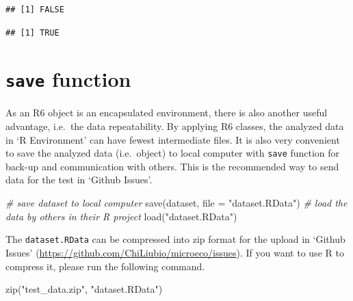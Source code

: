 \documentclass[
]{book}
\newenvironment{Shaded}{\begin{snugshade}}{\end{snugshade}}
\newcommand{\AttributeTok}[1]{\textcolor[rgb]{0.77,0.63,0.00}{#1}}
\newcommand{\CommentTok}[1]{\textcolor[rgb]{0.56,0.35,0.01}{\textit{#1}}}
\newcommand{\ConstantTok}[1]{\textcolor[rgb]{0.00,0.00,0.00}{#1}}
\newcommand{\FunctionTok}[1]{\textcolor[rgb]{0.00,0.00,0.00}{#1}}
\newcommand{\NormalTok}[1]{#1}
\newcommand{\OtherTok}[1]{\textcolor[rgb]{0.56,0.35,0.01}{#1}}
\newcommand{\SpecialCharTok}[1]{\textcolor[rgb]{0.00,0.00,0.00}{#1}}
\newcommand{\StringTok}[1]{\textcolor[rgb]{0.31,0.60,0.02}{#1}}
\begin{document}
\begin{verbatim}
## [1] FALSE
\end{verbatim}

\begin{Shaded}
\end{Shaded}

\begin{verbatim}
## [1] TRUE
\end{verbatim}

\hypertarget{save-function}{%
\section{\texorpdfstring{\texttt{save} function}{save function}}\label{save-function}}

As an R6 object is an encapsulated environment, there is also another useful advantage, i.e.~the data repeatability.
By applying R6 classes, the analyzed data in `R Environment' can have fewest intermediate files.
It is also very convenient to save the analyzed data (i.e.~object) to local computer with \texttt{save} function for back-up and communication with others.
This is the recommended way to send data for the test in `Github Issues'.

\begin{Shaded}
\begin{Highlighting}[]
\CommentTok{\# save \textquotesingle{}dataset\textquotesingle{} to local computer}
\FunctionTok{save}\NormalTok{(dataset, }\AttributeTok{file =} \StringTok{"dataset.RData"}\NormalTok{)}
\CommentTok{\# load the data by others in their R project}
\FunctionTok{load}\NormalTok{(}\StringTok{"dataset.RData"}\NormalTok{)}
\end{Highlighting}
\end{Shaded}

The \texttt{dataset.RData} can be compressed into zip format for the upload in `Github Issues' (\url{https://github.com/ChiLiubio/microeco/issues}).
If you want to use R to compress it, please run the following command.

\begin{Shaded}
\begin{Highlighting}[]
\FunctionTok{zip}\NormalTok{(}\StringTok{"test\_data.zip"}\NormalTok{, }\StringTok{"dataset.RData"}\NormalTok{)}
\end{Highlighting}
\end{Shaded}
\end{document}

